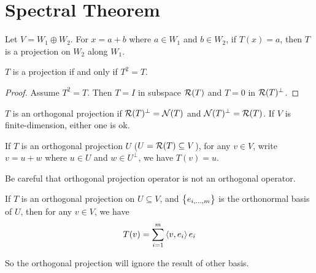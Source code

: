 \section{Spectral Theorem}

\begin{definition}[Projection]
    Let $V = W_1 \oplus W_2$. For $x = a + b$ where $a \in W_1$ and $b \in W_2$, if $T(x) = a$, then $T$ is a projection on $W_2$ along $W_1$.
\end{definition}


\begin{theorem}
    $T$ is a projection if and only if $T^2 = T$.    
\end{theorem}
\begin{proof}
    Assume $T^2 = T$. Then $T=I$ in subspace $\mathcal{R}(T)$ and $T = 0$ in $\mathcal{R}(T)^\perp$.
\end{proof}

\begin{definition}
    $T$ is an orthogonal projection if $\mathcal{R}(T)^\perp = \mathcal{N}(T)$ and $\mathcal{N}(T)^\perp = \mathcal{R}(T)$. If $V$ is finite-dimension, either one is ok.
    
    If $T$ is an orthogonal projection $U$ ($U = \mathcal{R}(T) \subseteq V$), for any $v \in V$, write $v = u + w$ where $u \in U$ and $w \in U^\perp$, we have $T(v) = u$.
\end{definition}

Be careful that orthogonal projection operator is not an orthogonal operator.

\begin{theorem}
    If $T$ is an orthogonal projection on $U \subseteq V$, and $\set{e_{i, ..., m}}$ is the orthonormal basis of $U$, then for any $v \in V$, we have
    \begin{equation}
        T(v) = \sum_{i=1}^{m} \left\langle \displaystyle v, e_i \right\rangle e_i
    \end{equation}
    
    So the orthogonal projection will ignore the result of other basis.
\end{theorem}



